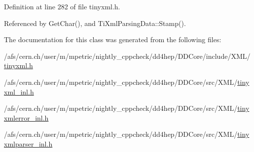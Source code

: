 Definition at line 282 of file tinyxml.h.

Referenced by GetChar(), and TiXmlParsingData::Stamp().

The documentation for this class was generated from the following files:\begin{DoxyCompactItemize}
\item 
/afs/cern.ch/user/m/mpetric/nightly\_\-cppcheck/dd4hep/DDCore/include/XML/\hyperlink{tinyxml_8h}{tinyxml.h}\item 
/afs/cern.ch/user/m/mpetric/nightly\_\-cppcheck/dd4hep/DDCore/src/XML/\hyperlink{tinyxml__inl_8h}{tinyxml\_\-inl.h}\item 
/afs/cern.ch/user/m/mpetric/nightly\_\-cppcheck/dd4hep/DDCore/src/XML/\hyperlink{tinyxmlerror__inl_8h}{tinyxmlerror\_\-inl.h}\item 
/afs/cern.ch/user/m/mpetric/nightly\_\-cppcheck/dd4hep/DDCore/src/XML/\hyperlink{tinyxmlparser__inl_8h}{tinyxmlparser\_\-inl.h}\end{DoxyCompactItemize}
